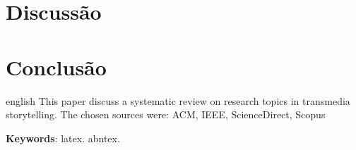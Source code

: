 \documentclass[
article,			%
11pt,				%
oneside,			%
a4paper,			%
english,			%
brazil,				%
sumario=tradicional
]{abntex2}
\begin{document}
  \section{Discussão}



  \section{Conclusão}


  \postextual



  \emptythanks
  \maketitle

  \renewcommand{\resumoname}{Abstract}
  \begin{resumoumacoluna}
    \begin{otherlanguage*}{english}
      This paper discuss a systematic review on research topics in transmedia storytelling. The chosen sources were: ACM, IEEE, ScienceDirect, Scopus

      \vspace{\onelineskip}

      \noindent
      \textbf{Keywords}: latex. abntex.
    \end{otherlanguage*}
  \end{resumoumacoluna}


  
\end{document}

